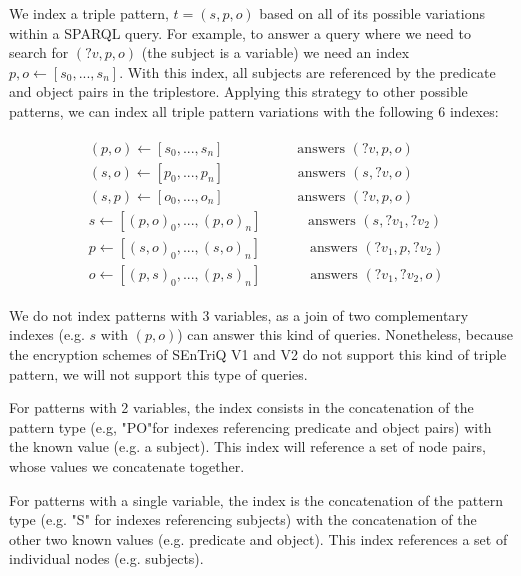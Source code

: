 We index a triple pattern, $t = (s, p, o)$ based on all of its possible variations within a \gls{SPARQL} query. For example, to answer a query where we need to search for $(?v, p, o)$ (the subject is a variable) we need an index $p,o \leftarrow [s_0, ..., s_n]$. With this index, all subjects are referenced by the predicate and object pairs in the triplestore. Applying this strategy to other possible patterns, we can index all triple pattern variations with the following 6 indexes:

\begin{align}
    \begin{split}
        &(p,o) \leftarrow [s_0, ..., s_n] \;\;\;\;\;\;\;\;\;\;\;\;\;\;\;\;\;\;\; \text{answers $(?v, p, o)$} \\
        &(s,o) \leftarrow [p_0, ..., p_n] \;\;\;\;\;\;\;\;\;\;\;\;\;\;\;\;\;\;\; \text{answers $(s, ?v, o)$} \\
        &(s,p) \leftarrow [o_0, ..., o_n] \;\;\;\;\;\;\;\;\;\;\;\;\;\;\;\;\;\;\; \text{answers $(?v, p, o)$} \\
        &s \leftarrow [(p,o)_0, ..., (p,o)_n] \;\;\;\;\;\;\;\;\;\;\;\; \text{answers $(s, ?v_1, ?v_2)$} \\
        &p \leftarrow [(s,o)_0, ..., (s,o)_n] \,\;\;\;\;\;\;\;\;\;\;\;\; \text{answers $(?v_1, p, ?v_2)$} \\
        &o \leftarrow [(p,s)_0, ..., (p,s)_n] \,\;\;\;\;\;\;\;\;\;\;\;\; \text{answers $(?v_1, ?v_2, o)$}
    \end{split}
\end{align}

We do not index patterns with 3 variables, as a join of two complementary indexes (e.g. $s$ with $(p, o)$) can answer this kind of queries. Nonetheless, because the encryption schemes of \gls{SEnTriQ} V1 and V2 do not support this kind of triple pattern, we will not support this type of queries.

For patterns with 2 variables, the index consists in the concatenation of the pattern type (e.g, "PO"\space for indexes referencing predicate and object pairs) with the known value (e.g. a subject). This index will reference a set of node pairs, whose values we concatenate together.

For patterns with a single variable, the index is the concatenation of the pattern type (e.g. "S" \space for indexes referencing subjects) with the concatenation of the other two known values (e.g. predicate and object). This index references a set of individual nodes (e.g. subjects).

